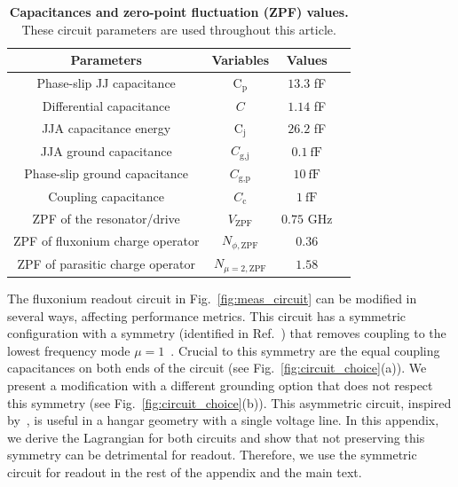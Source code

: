 \documentclass[%
reprint,
superscriptaddress,
 amsmath,amssymb,
 aps,
 prx,
longbibliography,
floatfix,
]{revtex4-2}
\begin{document}
\begin{table}[htb]
    \begin{center}
    \begin{tabular}{|c |c| c |c| }
     \hline
     \textbf{Parameters} & \textbf{Variables} & \textbf{Values}\\ 
    \hline
    Phase-slip JJ capacitance &$\textrm{C}_\textrm{p}$ &$13.3$ fF\\ 
    \hline
    Differential capacitance &$C$ &$1.14$ fF\\ 
    \hline
    JJA capacitance energy&$\textrm{C}_\textrm{j}$&$26.2$ fF\\ 
    \hline
    JJA ground capacitance&$C_\textrm{g,j}$&$0.1 \ \mathrm{fF}$\\ 
    \hline
    Phase-slip ground capacitance&$C_\textrm{g,p}$&$10 \ \mathrm{fF}$\\ 
    \hline
    Coupling capacitance&$C_\textrm{c}$ &$1 \ \mathrm{fF}$\\ 
     \hline
      ZPF of the resonator/drive&$V_{\mathrm{ZPF}}$&$0.75$ GHz\\
     \hline
      ZPF of fluxonium charge operator&$N_{\phi,\mathrm{ZPF}}$&$0.36$\\
     \hline
      ZPF of parasitic charge operator&$N_{\mu=2,\mathrm{ZPF}}$&$1.58$\\
     \hline
    \end{tabular}
    \end{center}
    
    \caption{{\bf Capacitances and zero-point fluctuation (ZPF) values.} These circuit parameters are used throughout this article.}
    \label{tab:params}
    \end{table}
    The fluxonium readout circuit in Fig.~\ref{fig:meas_circuit} can be modified in several ways, affecting performance metrics. This circuit has a symmetric configuration with a symmetry (identified in Ref.~\cite{ferguson2013symmetries}) that removes coupling to the lowest frequency mode $\mu=1$~\cite{viola2015collective}. Crucial to this symmetry are the equal coupling capacitances on both ends of the circuit (see Fig.~\ref{fig:circuit_choice}(a)). We present a modification with a different grounding option that does not respect this symmetry (see Fig.~\ref{fig:circuit_choice}(b)). This asymmetric circuit, inspired by~\cite{zhang_universal_2021}, is useful in a hangar geometry with a single voltage line. In this appendix, we derive the Lagrangian for both circuits and show that not preserving this symmetry can be detrimental for readout. Therefore, we use the symmetric circuit for readout in the rest of the appendix and the main text.
\end{document}
